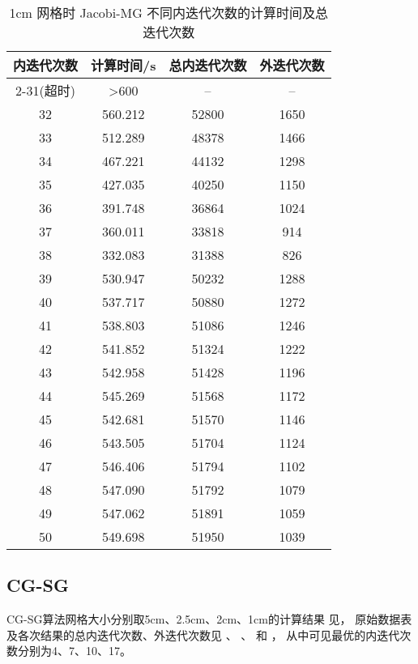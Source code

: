 \begin{datasheet}
\begin{table}
\centering
\caption{1cm 网格时 Jacobi-MG 不同内迭代次数的计算时间及总迭代次数}
\label{tab:equsolve.iter.jacobi-mg.1cm}
\begin{tabular}{cccc}
\toprule
内迭代次数 & 计算时间/s & 总内迭代次数 & 外迭代次数\\
\midrule
2-31(超时) & >600 & -- & -- \\ %
32 & 560.212 & 52800 & 1650\\
33 & 512.289 & 48378 & 1466\\
34 & 467.221 & 44132 & 1298\\
35 & 427.035 & 40250 & 1150\\
36 & 391.748 & 36864 & 1024\\
37 & 360.011 & 33818 & 914\\
38 & 332.083 & 31388 & 826\\
39 & 530.947 & 50232 & 1288\\
40 & 537.717 & 50880 & 1272\\
41 & 538.803 & 51086 & 1246\\
42 & 541.852 & 51324 & 1222\\
43 & 542.958 & 51428 & 1196\\
44 & 545.269 & 51568 & 1172\\
45 & 542.681 & 51570 & 1146\\
46 & 543.505 & 51704 & 1124\\
47 & 546.406 & 51794 & 1102\\
48 & 547.090 & 51792 & 1079\\
49 & 547.062 & 51891 & 1059\\
50 & 549.698 & 51950 & 1039\\
\bottomrule
\end{tabular}
\end{table}

\end{datasheet}


\subsection{CG-SG}
\label{sec:equsolve.iter.cg-sg}

CG-SG算法网格大小分别取5cm、2.5cm、2cm、1cm的计算结果
见，
原始数据表及各次结果的总内迭代次数、外迭代次数见
、%
、%
和%
，
从中可见最优的内迭代次数分别为4、7、10、17。

